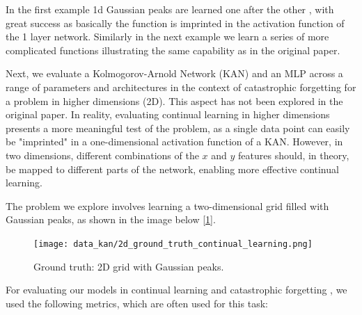 \documentclass[conference]{IEEEtran}
\begin{document}
In the first example 1d Gaussian peaks are learned one after the other , with
great success as basically the function is imprinted in the activation function
of the 1 layer network. Similarly in the next example we learn a series of more
complicated functions illustrating the same capability as in the original
paper.

Next, we evaluate a Kolmogorov-Arnold Network (KAN) and an MLP across a range
of parameters and architectures in the context of catastrophic forgetting for a
problem in higher dimensions (2D). This aspect has not been explored in the
original paper. In reality, evaluating continual learning in higher dimensions
presents a more meaningful test of the problem, as a single data point can
easily be "imprinted" in a one-dimensional activation function of a KAN.
However, in two dimensions, different combinations of the \( x \) and \( y \)
features should, in theory, be mapped to different parts of the network,
enabling more effective continual learning.

The problem we explore involves learning a two-dimensional grid filled with
Gaussian peaks, as shown in the image below [\ref{fig:2d_ground_truth}].

\begin{figure}[H]
    \centering
    \texttt{[image: data\_kan/2d\_ground\_truth\_continual\_learning.png]}
    \caption{Ground truth: 2D grid with Gaussian peaks.}
    \label{fig:2d_ground_truth}
\end{figure}

For evaluating our models in continual learning and catastrophic forgetting ,
we used the following metrics, which are often used for this task:
\end{document}
